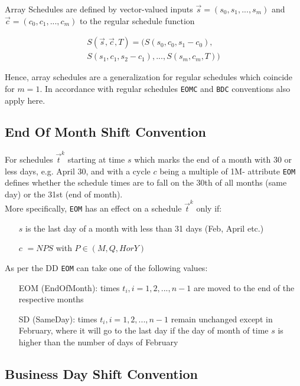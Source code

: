\documentclass[9pt,oneside]{amsart}
\newcommand{\attr}[1]{\texttt{#1}}
\newcommand{\sdl}[3]{S(#1,#2,#3)}
\begin{document}
\begin{multicols}{2}
Array Schedules are defined by vector-valued inputs $\vec{s}=(s_0,s_1,...,s_m)$ and $\vec{c}=(c_0,c_1,...,c_m)$ to the regular schedule function

\begin{multline*}
	\sdl{\vec{s}}{\vec{c}}{T} = (\sdl{s_0}{c_0}{s_1-c_0},\\
					\sdl{s_1}{c_1}{s_2-c_1},...,\sdl{s_m}{c_m}{T})
\end{multline*}


Hence, array schedules are a generalization for regular schedules which coincide for $m=1$. In accordance with regular schedules \attr{EOMC} and \attr{BDC} conventions also apply here.


\subsection{End Of Month Shift Convention}\label{sec:eomc}

For schedules $\vec{t}^k$ starting at time $s$ which marks the end of a month with 30 or less days, e.g. April 30, and with a cycle $c$ being a multiple of 1M- attribute \attr{EOM} defines whether the schedule times are to fall on the 30th of all months (same day) or the 31st (end of month).\\ 

More specifically, \attr{EOM} has an effect on a schedule $\vec{t}^k$ only if:

\begin{itemize}
	\item[$s$] is the last day of a month with less than 31 days (Feb, April etc.)

	\item[$c$] $=NPS$ with $P\in(M, Q, H or Y)$
\end{itemize}

As per the DD \attr{EOM} can take one of the following values:
\begin{itemize}
	\item[EOM] (EndOfMonth): times $t_i,i=1,2,...,n-1$ are moved to the end of the respective months

	\item[SD] (SameDay): times $t_i,i=1,2,...,n-1$ remain unchanged except in February, where it will go to the last day if the day of month of time $s$ is higher than the number of days of February
\end{itemize}


\subsection{Business Day Shift Convention}\label{sec:bdc}


\end{multicols}
\end{document}
